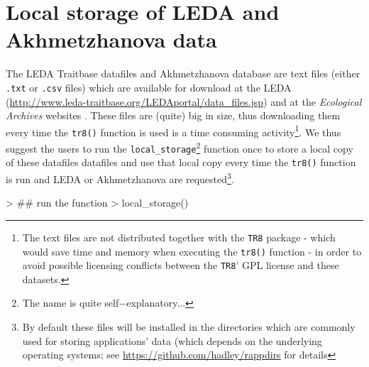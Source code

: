 \documentclass{article}
\begin{document}
  



\section{Local storage of LEDA and Akhmetzhanova data}
\label{sec:leda}

  The LEDA Traitbase datafiles and Akhmetzhanova database are text files (either \texttt{.txt} or \texttt{.csv} files) which are
  available for download at the LEDA (\url{http://www.leda-traitbase.org/LEDAportal/data_files.jsp}) and at the\textit{ Ecological Archives} websites . These
  files are (quite) big in size, thus downloading them every time the
  \texttt{tr8()} function is used is a time consuming
  activity\footnote{The text files are not distributed together with the
    \texttt{TR8} package - which would save time and memory when executing
    the \texttt{tr8()} function - in order to avoid possible licensing
    conflicts between the \texttt{TR8}' GPL license and these datasets.}. We
  thus suggest the users to run the 
  \texttt{local\_storage}\footnote{The name is quite
    self$-$explanatory...} function once to store a local copy of these datafiles
  datafiles and use that local copy every time the \texttt{tr8()} function is run and LEDA or Akhmetzhanova are requested\footnote{By default these files will be installed in the directories which are commonly used for storing applications' data (which depends on the underlying operating systems; see \url{https://github.com/hadley/rappdirs} for details}.
  
  
\begin{Schunk}
\begin{Sinput}
> ## run the function
> local_storage()
\end{Sinput}
\end{Schunk}

 

\end{document}
